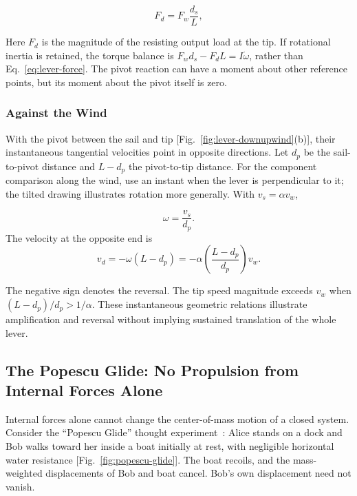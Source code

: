 \documentclass[reprint,aps,pra,longbibliography]{revtex4-2}
\begin{document}
\begin{equation}
F_d = F_w \frac{d_s}{L},\label{eq:lever-force}
\end{equation}

Here \(F_d\) is the magnitude of the resisting output load at the tip. If rotational inertia is retained, the torque balance is \(F_wd_s-F_dL=I\dot\omega\), rather than Eq.~\eqref{eq:lever-force}. The pivot reaction can have a moment about other reference points, but its moment about the pivot itself is zero.


\subsubsection{Against the Wind}


With the pivot between the sail and tip [Fig.~\ref{fig:lever-downupwind}(b)], their instantaneous tangential velocities point in opposite directions. Let \(d_p\) be the sail-to-pivot distance and \(L-d_p\) the pivot-to-tip distance. For the component comparison along the wind, use an instant when the lever is perpendicular to it; the tilted drawing illustrates rotation more generally. With \(v_s=\alpha v_w\),

\begin{equation}
\omega = \frac{v_s}{d_p}.
\end{equation}
The velocity at the opposite end is
\begin{equation}
v_d = -\omega (L - d_p) = -\alpha \left(\frac{L - d_p}{d_p}\right) v_w.
\end{equation}

The negative sign denotes the reversal. The tip speed magnitude exceeds \(v_w\) when \((L-d_p)/d_p>1/\alpha\). These instantaneous geometric relations illustrate amplification and reversal without implying sustained translation of the whole lever.


\subsection{The Popescu Glide: No Propulsion from Internal Forces Alone}


Internal forces alone cannot change the center-of-mass motion of a closed system. Consider the ``Popescu Glide'' thought experiment~\cite{popescu_talk_2024}: Alice stands on a dock and Bob walks toward her inside a boat initially at rest, with negligible horizontal water resistance [Fig.~\ref{fig:popescu-glide}]. The boat recoils, and the mass-weighted displacements of Bob and boat cancel. Bob's own displacement need not vanish.
\end{document}
